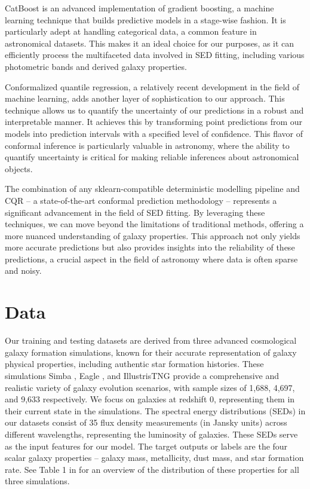 \documentclass[letterpaper]{article} %
\begin{document}
CatBoost is an advanced implementation of gradient boosting, a machine learning technique that builds predictive models in a stage-wise fashion. It is particularly adept at handling categorical data, a common feature in astronomical datasets. This makes it an ideal choice for our purposes, as it can efficiently process the multifaceted data involved in SED fitting, including various photometric bands and derived galaxy properties.

Conformalized quantile regression, a relatively recent development in the field of machine learning, adds another layer of sophistication to our approach. This technique allows us to quantify the uncertainty of our predictions in a robust and interpretable manner. It achieves this by transforming point predictions from our models into prediction intervals with a specified level of confidence. This flavor of conformal inference \cite{shafer2008tutorial_conformal} is particularly valuable in astronomy, where the ability to quantify uncertainty is critical for making reliable inferences about astronomical objects.

The combination of any sklearn-compatible deterministic modelling pipeline and CQR -- a state-of-the-art conformal prediction methodology -- represents a significant advancement in the field of SED fitting. By leveraging these techniques, we can move beyond the limitations of traditional methods, offering a more nuanced understanding of galaxy properties. This approach not only yields more accurate predictions but also provides insights into the reliability of these predictions, a crucial aspect in the field of astronomy where data is often sparse and noisy.

\section{Data}
Our training and testing datasets are derived from three advanced cosmological galaxy formation simulations, known for their accurate representation of galaxy physical properties, including authentic star formation histories. These simulations  {\sc Simba} \cite{dave_simba}, {\sc Eagle} \cite{schaye_2015_eagle,schaller_2015_eagle,mcalpine_2016_eagle_cat}, and {\sc IllustrisTNG} \cite{vogelsberger2014introducingillustris}  provide a comprehensive and realistic variety of galaxy evolution scenarios, with sample sizes of 1,688, 4,697, and 9,633 respectively. We focus on galaxies at redshift 0, representing them in their current state in the simulations. The spectral energy distributions (SEDs) in our datasets consist of 35 flux density measurements (in Jansky units) across different wavelengths, representing the luminosity of galaxies. These SEDs serve as the input features for our model. The target outputs or labels are the four scalar galaxy properties -- galaxy mass, metallicity, dust mass, and star formation rate. See Table 1 in \citet{Gilda21} for an overview of the distribution of these properties for all three simulations.
\end{document}

